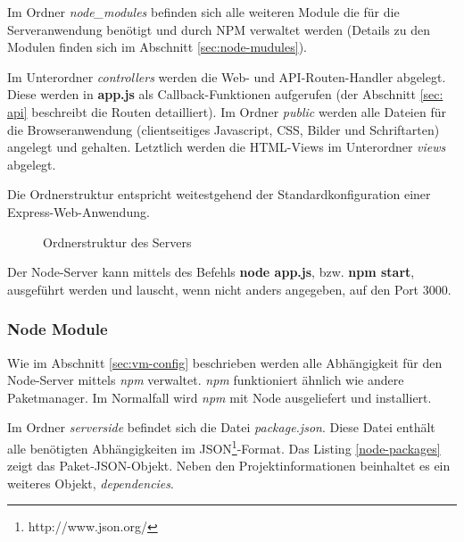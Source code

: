 Im Ordner \textit{node\_modules} befinden sich alle weiteren Module die für die Serveranwendung benötigt und durch NPM verwaltet werden (Details zu den Modulen finden sich im Abschnitt \ref{sec:node-mudules}). 

Im Unterordner \textit{controllers} werden die Web- und API-Routen-Handler abgelegt. 
Diese werden in \textbf{app.js} als Callback-Funktionen aufgerufen (der Abschnitt \ref{sec: api} beschreibt die Routen detailliert). 
Im Ordner \textit{public} werden alle Dateien für die Browseranwendung (clientseitiges Javascript, CSS, Bilder und Schriftarten) angelegt und gehalten. 
Letztlich werden die HTML-Views im Unterordner \textit{views} abgelegt. 

Die Ordnerstruktur entspricht weitestgehend der Standardkonfiguration einer Express-Web-Anwendung.

\begin{figure}[h!]
	\centering
			\begin{minipage}[c]{\textwidth} %
			\end{minipage}
	\caption{Ordnerstruktur des Servers}
	\label{fig:server-tree}
\end{figure}

Der Node-Server kann mittels des Befehls \textbf{node app.js}, bzw. \textbf{npm start}, ausgeführt werden und lauscht, wenn nicht anders angegeben, auf den Port 3000. 

\pagebreak

\subsubsection{Node Module \label{sec:node-mudules}}

Wie im Abschnitt \ref{sec:vm-config} beschrieben werden alle Abhängigkeit für den Node-Server mittels \emph{npm} verwaltet. 
\emph{npm} funktioniert ähnlich wie andere Paketmanager. 
Im Normalfall wird \emph{npm} mit Node ausgeliefert und installiert. 

Im Ordner \textit{serverside} befindet sich die Datei \emph{package.json}. Diese Datei enthält alle benötigten Abhängigkeiten im JSON\footnote{http://www.json.org/}-Format. Das Listing \ref{node-packages} zeigt das Paket-JSON-Objekt. 
Neben den Projektinformationen beinhaltet es ein weiteres Objekt, \emph{dependencies}. 

